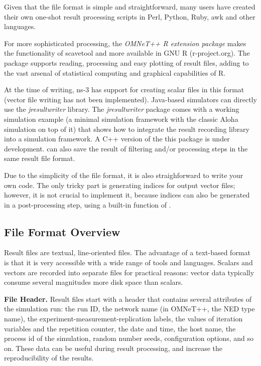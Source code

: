 Given that the file format is simple and straightforward, many users have
created their own one-shot result processing scripts in Perl, Python, Ruby,
awk and other languages.

For more sophisticated processing, the \textit{OMNeT++ R extension package}
makes the functionality of scavetool and more available in GNU R
(r-project.org). The package supports reading, processing and easy plotting
of result files, adding to the vast arsenal of statistical computing and
graphical capabilities of R.

At the time of writing, ns-3 has support for creating scalar files in this
format (vector file writing has not been implemented). Java-based
simulators can directly use the \textit{jresultwriter} library. The
\textit{jresultwriter} package comes with a working simulation example (a
minimal simulation framework with the classic Aloha simulation on top of
it) that shows how to integrate the result recording library into a
simulation framework. A C++ version of the this package is under
development.  can also save the result of filtering and/or
processing steps in the same result file format.

Due to the simplicity of the file format, it is also straighforward to
write your own code. The only tricky part is generating indices for output
vector files; however, it is not crucial to implement it, because indices
can also be generated in a post-processing step, using a built-in function
of .


\subsection{File Format Overview}

Result files are textual, line-oriented files. The advantage of a
text-based format is that it is very accessible with a wide range of tools
and languages. Scalars and vectors are recorded into separate files
for practical reasons: vector data typically consume several magnitudes
more disk space than scalars.

\textbf{File Header.}
Result files start with a header that contains several attributes of the
simulation run: the run ID, the network name (in OMNeT++, the NED type
name), the experiment-measurement-replication labels, the values of
iteration variables and the repetition counter, the date and time, the host
name, the process id of the simulation, random number seeds, configuration
options, and so on. These data can be useful during result processing, and
increase the reproducibility of the results.


